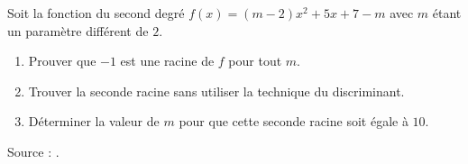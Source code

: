 
\begin{exercice}\label{exoPremiere-0045}

    Soit la fonction du second degré \( f(x)=(m-2)x^2+5x+7-m\) avec \( m\) étant un paramètre différent de \( 2\).
    \begin{enumerate}
        \item
            Prouver que \( -1\) est une racine de \( f\) pour tout \( m\).
        \item
            Trouver la seconde racine sans utiliser la technique du discriminant.
        \item
            Déterminer la valeur de \( m\) pour que cette seconde racine soit égale à \( 10\).
    \end{enumerate}
    Source : \cite{nhcezt}.
\end{exercice}
